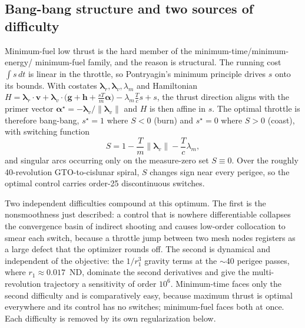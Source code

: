 \documentclass[11pt]{article}
\begin{document}
\subsection{Bang-bang structure and two sources of difficulty}
Minimum-fuel low thrust is the hard member of the minimum-time/minimum-energy/%
minimum-fuel family, and the reason is structural. The running cost $\int s\,dt$
is linear in the throttle, so Pontryagin's minimum principle drives $s$ onto its
bounds. With costates $\boldsymbol\lambda_r,\boldsymbol\lambda_v,\lambda_m$ and
Hamiltonian $H=\boldsymbol\lambda_r\!\cdot\!\boldsymbol v+\boldsymbol\lambda_v
\!\cdot\!\big(\boldsymbol g+\boldsymbol h+\tfrac{sT}{m}\boldsymbol\alpha\big)
-\lambda_m\tfrac{T}{c}s+s$, the thrust direction aligns with the primer vector
$\boldsymbol\alpha^\star=-\boldsymbol\lambda_v/\lVert\boldsymbol\lambda_v\rVert$
and $H$ is then affine in $s$. The optimal throttle is therefore bang-bang,
$s^\star=1$ where $S<0$ (burn) and $s^\star=0$ where $S>0$ (coast), with
switching function
\begin{equation}
S=1-\frac{T}{m}\lVert\boldsymbol\lambda_v\rVert-\frac{T}{c}\lambda_m ,
\label{eq:switch}
\end{equation}
and singular arcs occurring only on the measure-zero set $S\equiv0$. Over the
roughly 40-revolution GTO-to-cislunar spiral, $S$ changes sign near every perigee,
so the optimal control carries order-25 discontinuous switches.

Two independent difficulties compound at this optimum. The first is the
nonsmoothness just described: a control that is nowhere differentiable collapses
the convergence basin of indirect shooting and causes low-order collocation to
smear each switch, because a throttle jump between two mesh nodes registers as a
large defect that the optimizer rounds off. The second is dynamical and
independent of the objective: the $1/r_1^3$ gravity terms at the $\sim$40 perigee
passes, where $r_1\approx0.017$~ND, dominate the second derivatives and give the
multi-revolution trajectory a sensitivity of order $10^6$. Minimum-time faces
only the second difficulty and is comparatively easy, because maximum thrust is
optimal everywhere and its control has no switches; minimum-fuel faces both at
once. Each difficulty is removed by its own regularization below.
\end{document}
